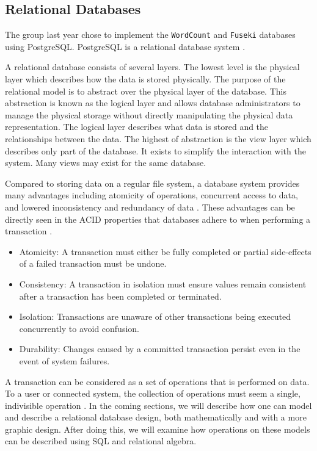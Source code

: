 \subsection{Relational Databases}\label{relational_databases}
The group last year chose to implement the \texttt{WordCount} and \texttt{Fuseki} databases using PostgreSQL.
PostgreSQL is a relational database system \cite{knox2020}.


A relational database consists of several layers.
The lowest level is the physical layer which describes how the data is stored physically.
The purpose of the relational model is to abstract over the physical layer of the database.
This abstraction is known as the logical layer and allows database administrators to manage the physical storage without directly manipulating the physical data representation.
The logical layer describes what data is stored and the relationships between the data.
The highest of abstraction is the view layer which describes only part of the database. It exists to simplify the interaction with the system. Many views may exist for the same database.
\cite{DBSBook}

Compared to storing data on a regular file system, a database system provides many advantages including atomicity of operations, concurrent access to data, and lowered inconsistency and redundancy of data \cite{DBSBook}.
These advantages can be directly seen in the ACID properties that databases adhere to when performing a transaction \cite{DBSBook}.
\begin{itemize} \label{ACID}
    \item Atomicity: A transaction must either be fully completed or partial side-effects of a failed transaction must be undone.
    \item Consistency: A transaction in isolation must ensure values remain consistent after a transaction has been completed or terminated.
    \item Isolation: Transactions are unaware of other transactions being executed concurrently to avoid confusion.
    \item Durability: Changes caused by a committed transaction persist even in the event of system failures.
\end{itemize}

A transaction can be considered as a set of operations that is performed on data.
To a user or connected system, the collection of operations must seem a single, indivisible operation \cite{DBSBook}.
In the coming sections, we will describe how one can model and describe a relational database design, both mathematically and with a more graphic design.
After doing this, we will examine how operations on these models can be described using SQL and relational algebra.

